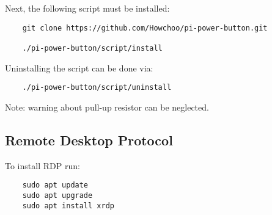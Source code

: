 Next, the following script must be installed:

\begin{verbatim}
	git clone https://github.com/Howchoo/pi-power-button.git
	
	./pi-power-button/script/install
\end{verbatim}

Uninstalling the script can be done via:

\begin{verbatim}
	./pi-power-button/script/uninstall
\end{verbatim}

Note: warning about pull-up resistor can be neglected.

\subsection{Remote Desktop Protocol}
To install RDP run:

\begin{verbatim}
	sudo apt update
	sudo apt upgrade
	sudo apt install xrdp
\end{verbatim}
